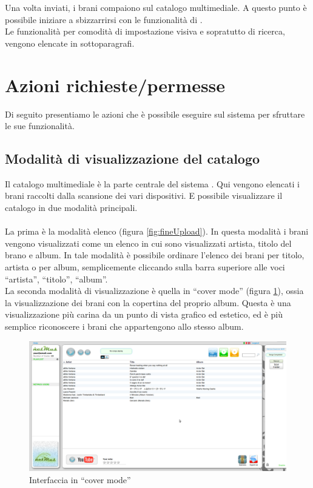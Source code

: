 Una volta inviati, i brani compaiono sul catalogo multimediale.
A questo punto \`e possibile iniziare a sbizzarrirsi con le funzionalit\`a di
.\\

Le funzionalit\`a per comodit\`a di impostazione visiva e
sopratutto di ricerca, vengono elencate in sottoparagrafi.

\newpage
\section{Azioni richieste/permesse}
Di seguito presentiamo le azioni che \`e possibile eseguire sul sistema per
sfruttare le sue funzionalit\`a.

\subsection{Modalit\`a di visualizzazione del catalogo}
Il catalogo multimediale \`e la parte centrale del sistema . Qui
vengono elencati i brani raccolti dalla scansione dei vari dispositivi. E
possibile visualizzare il catalogo in due modalit\`a principali.\\
\\
La prima \`e la modalit\`a elenco (figura \ref{fig:fineUpload}). In questa
modalit\`a i brani vengono visualizzati come un elenco in cui sono visualizzati artista, titolo del brano e
album. In tale modalit\`a \`e possibile ordinare l'elenco dei brani per titolo,
artista o per album, semplicemente cliccando sulla barra superiore alle voci
``artista'', ``titolo'', ``album''.\\

La seconda modalit\`a di visualizzazione \`e quella in ``cover mode'' (figura
\ref{fig:coverMode}), ossia la visualizzazione dei brani con la copertina del
proprio album. Questa \`e una visualizzazione pi\`u carina da un punto di vista grafico ed estetico, ed \`e
pi\`u semplice riconoscere i brani che appartengono allo stesso album.\\

\begin{figure}[!htbp]
  \centering
  \includegraphics[width=14cm]{img/MU/song_loaded.png}
\caption{Interfaccia in ``cover mode''}
\label{fig:coverMode}
\end{figure}

